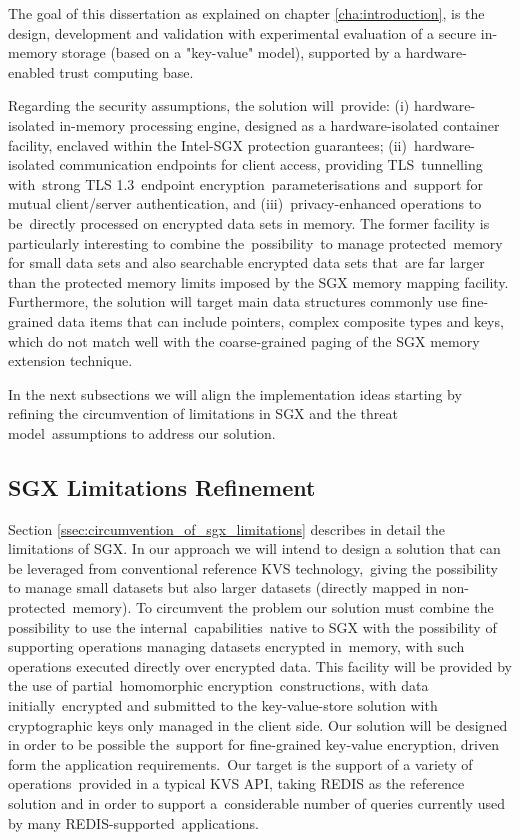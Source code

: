 The goal of this dissertation as explained on chapter \ref{cha:introduction}, is the design, development and validation with experimental evaluation of a secure in-memory storage (based on a "key-value" model), supported by a hardware-enabled trust computing base.

Regarding the security assumptions, the solution will provide: (i) hardware-isolated in-memory processing engine, designed as a hardware-isolated container facility, enclaved within the Intel-SGX protection guarantees; (ii) hardware-isolated communication endpoints for client access, providing TLS tunnelling with strong TLS 1.3 endpoint encryption parameterisations and support for mutual client/server authentication, and (iii) privacy-enhanced operations to be directly processed on encrypted data sets in memory. The former facility is particularly interesting to combine the possibility to manage protected memory for small data sets and also searchable encrypted data sets that are far larger than the protected memory limits imposed by the SGX memory mapping facility. Furthermore, the solution will target main data structures commonly use fine-grained data items that can include pointers, complex composite types and keys, which do not match well with the coarse-grained paging of the SGX memory extension technique.

In the next subsections we will align the implementation ideas starting by refining the circumvention of limitations in SGX and the threat model assumptions to address our solution.

\subsection{\gls{SGX} Limitations Refinement}
\label{ssec:sgx_limitations_refinement}

Section \ref{ssec:circumvention_of_sgx_limitations} describes in detail the limitations of \gls{SGX}. In our approach we will intend to design a solution that can be leveraged from conventional reference KVS technology, giving the possibility to manage small datasets but also larger datasets (directly mapped in non-protected memory). To circumvent the problem our solution must combine the possibility to use the internal capabilities native to SGX with the possibility of supporting operations managing datasets encrypted in memory, with such operations executed directly over encrypted data. This facility will be provided by the use of partial homomorphic encryption constructions, with data initially encrypted and submitted to the key-value-store solution with cryptographic keys only managed in the client side. Our solution will be designed in order to be possible the support for fine-grained key-value encryption, driven form the application requirements. Our target is the support of a variety of operations provided in a typical KVS API, taking REDIS as the reference solution and in order to support a considerable number of queries currently used by many REDIS-supported applications.

